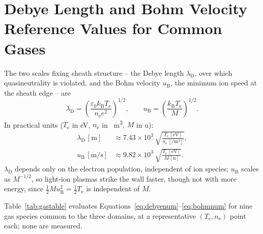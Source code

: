 \section{Debye Length and Bohm Velocity Reference Values for Common Gases}
\label{app:data:debye}

The two scales fixing sheath structure -- the Debye length $\lambda_{\mathrm{D}}$, over which quasineutrality is violated, and the Bohm velocity $u_{\mathrm{B}}$, the minimum ion speed at the sheath edge -- are
\begin{equation}
\lambda_{\mathrm{D}} = \left(\frac{\varepsilon_{0} k_{\mathrm{B}} T_{\mathrm{e}}}{n_{\mathrm{e}} e^{2}}\right)^{1/2},
\qquad
u_{\mathrm{B}} = \left(\frac{k_{\mathrm{B}} T_{\mathrm{e}}}{M}\right)^{1/2}.
\label{eq:debyebohm}
\end{equation}
In practical units ($T_{\mathrm{e}}$ in \si{\eV}, $n_{\mathrm{e}}$ in \si{\per\cubic\meter}, $M$ in \si{\amu}):
\begin{align}
\lambda_{\mathrm{D}}\,[\si{\meter}] &\approx 7.43\times 10^{3}\, \sqrt{\frac{T_{\mathrm{e}}\,[\si{\eV}]}{n_{\mathrm{e}}\,[\si{\per\cubic\meter}]}}, \label{eq:debyenum}\\
u_{\mathrm{B}}\,[\si{\meter\per\second}] &\approx 9.82\times 10^{3}\, \sqrt{\frac{T_{\mathrm{e}}\,[\si{\eV}]}{M\,[\si{\amu}]}}. \label{eq:bohmnum}
\end{align}
$\lambda_{\mathrm{D}}$ depends only on the electron population, independent of ion species; $u_{\mathrm{B}}$ scales as $M^{-1/2}$, so light-ion plasmas strike the wall faster, though not with more energy, since $\tfrac12 M u_{\mathrm{B}}^2 = \tfrac12 T_{\mathrm{e}}$ is independent of $M$.

Table~\ref{tab:gastable} evaluates Equations~\eqref{eq:debyenum}--\eqref{eq:bohmnum} for nine gas species common to the three domains, at a representative $(T_{\mathrm{e}}, n_{\mathrm{e}})$ point each; none are measured.

